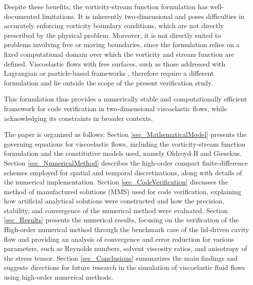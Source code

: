 \documentclass[preprint, 12pt]{elsarticle}
\begin{document}
Despite these benefits, the vorticity-stream function formulation has well-documented limitations. It is inherently two-dimensional and poses difficulties in accurately enforcing vorticity boundary conditions, which are not directly prescribed by the physical problem. Moreover, it is not directly suited to problems involving free or moving boundaries, since the formulation relies on a fixed computational domain over which the vorticity and stream function are defined. Viscoelastic flows with free surfaces, such as those addressed with Lagrangian or particle-based frameworks \citep{Rizzieri2024}, therefore require a different formulation and lie outside the scope of the present verification study.

This formulation thus provides a numerically stable and computationally efficient framework for code verification in two-dimensional viscoelastic flows, while acknowledging its constraints in broader contexts.

The paper is organized as follows: Section \ref{sec_MathematicalModel} presents the governing equations for viscoelastic flows, including the vorticity-stream function formulation and the constitutive models used, namely Oldroyd-B and Giesekus. Section \ref{sec_NumericalMethod} describes the high-order compact finite-difference schemes employed for spatial and temporal discretizations, along with details of the numerical implementation. Section \ref{sec_CodeVerification} discusses the method of manufactured solutions (MMS) used for code verification, explaining how artificial analytical solutions were constructed and how the precision, stability, and convergence of the numerical method were evaluated. Section \ref{sec_Results} presents the numerical results, focusing on the verification of the High-order numerical method through the benchmark case of the lid-driven cavity flow and providing an analysis of convergence and error reduction for various parameters, such as Reynolds numbers, solvent viscosity ratios, and anisotropy of the stress tensor. Section \ref{sec_Conclusions} summarizes the main findings and suggests directions for future research in the simulation of viscoelastic fluid flows using high-order numerical methods.

\end{document}
